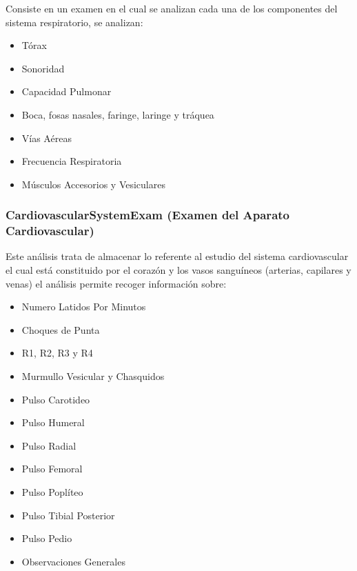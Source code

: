 Consiste en un examen en el cual se analizan cada una de los componentes del sistema respiratorio, se analizan:

\begin{itemize}
    \item Tórax
    \item Sonoridad
    \item Capacidad Pulmonar
    \item Boca, fosas nasales, faringe, laringe y tráquea 
    \item Vías Aéreas
    \item Frecuencia Respiratoria
    \item Músculos Accesorios y Vesiculares
\end{itemize}

\subsubsection{CardiovascularSystemExam (Examen del Aparato Cardiovascular)}

Este análisis trata de almacenar lo referente al estudio del sistema cardiovascular el cual está constituido por el corazón y los vasos sanguíneos (arterias, capilares y venas) el análisis permite recoger información sobre:

\begin{itemize}
    \item Numero Latidos Por Minutos 
    \item Choques de Punta
    \item R1, R2, R3 y R4
    \item Murmullo Vesicular y Chasquidos
    \item Pulso Carotideo
    \item Pulso Humeral
    \item Pulso Radial
    \item Pulso Femoral
    \item Pulso Poplíteo
    \item Pulso Tibial Posterior
    \item Pulso Pedio
    \item Observaciones Generales
\end{itemize}


